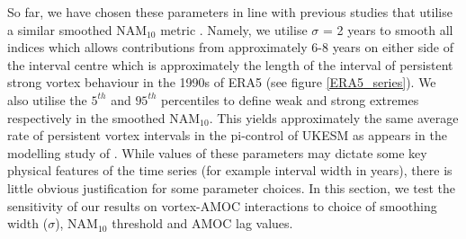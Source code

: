 So far, we have chosen these parameters in line with previous studies that utilise a similar smoothed NAM$_{10}$ metric \citep{reichlerStratospheric2012b}. Namely, we utilise $\sigma$ = 2 years to smooth all indices which allows contributions from approximately 6-8 years on either side of the interval centre which is approximately the length of the interval of persistent strong vortex behaviour in the 1990s of ERA5 (see figure \ref{ERA5_series}). We also utilise the $5^{th}$ and $95^{th}$ percentiles to define weak and strong extremes respectively in the smoothed NAM$_{10}$. This yields approximately the same average rate of persistent vortex intervals in the pi-control of UKESM as appears in the modelling study of \cite{reichlerStratospheric2012b}. While values of these parameters may dictate some key physical features of the time series (for example interval width in years), there is little obvious justification for some parameter choices. In this section, we test the sensitivity of our results on vortex-AMOC interactions to choice of smoothing width ($\sigma$), NAM$_{10}$ threshold and AMOC lag values. 

